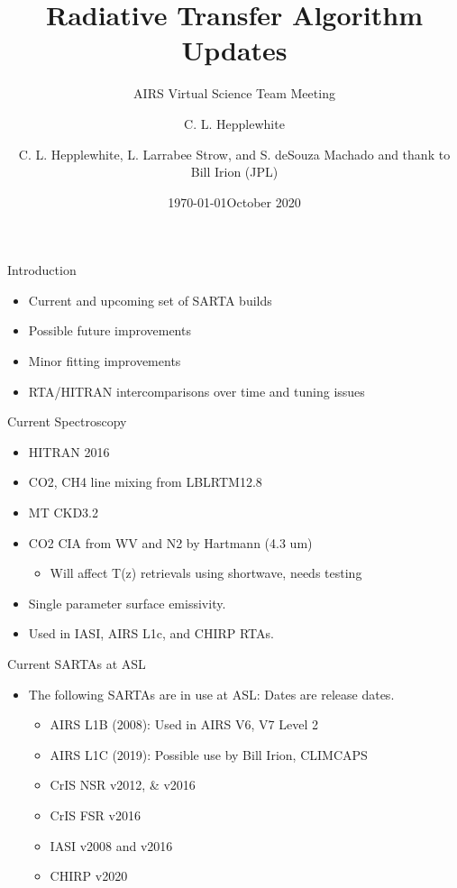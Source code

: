 \documentclass[10pt,t]{beamer}
\author{C. L. Hepplewhite}
\date{\today}
\title{\large Radiative Transfer Algorithm Updates}
\subtitle{\footnotesize{AIRS Virtual Science Team Meeting}}
\date{\vspace{0.1in}\footnotesize{October 2020 \vfill}}
\author{C. L. Hepplewhite\inst{1,2}, L. Larrabee Strow\inst{1,2}, and S. deSouza Machado\inst{1,2}  and thank to Bill Irion (JPL)}
\institute[UMBC]{\inst{1} UMBC Physics Dept. \and \inst{2}UMBC JCET}
\begin{document}
\maketitle

\begin{frame}{Introduction}
  \begin{itemize}
  \item Current and upcoming set of SARTA builds 
  \item Possible future improvements 
  \item Minor fitting improvements
  \item RTA/HITRAN intercomparisons over time and tuning issues
  \end{itemize}

\end{frame}
\begin{frame}{Current Spectroscopy}
  \begin{itemize}
  \item HITRAN 2016
  \item CO2, CH4 line mixing from LBLRTM12.8
  \item MT CKD3.2
  \item CO2 CIA from WV and N2 by Hartmann (4.3 um)
    \begin{itemize}
    \item Will affect T(z) retrievals using shortwave, needs testing
    \end{itemize}
  \item Single parameter surface emissivity.
  \item Used in IASI, AIRS L1c, and CHIRP RTAs.
  \end{itemize}
\end{frame}
\begin{frame}{Current SARTAs at ASL}

  \begin{itemize}
  \item The following SARTAs are in use at ASL:
    Dates are release dates.
    \begin{itemize}
    \item AIRS L1B (2008):  Used in AIRS V6, V7 Level 2
    \item AIRS L1C (2019):  Possible use by Bill Irion, CLIMCAPS
    \item CrIS NSR v2012, \& v2016  
    \item CrIS FSR v2016
    \item IASI v2008 and v2016
    \item CHIRP v2020
    \end{itemize}
  \end{itemize}

\end{frame}
\end{document}
